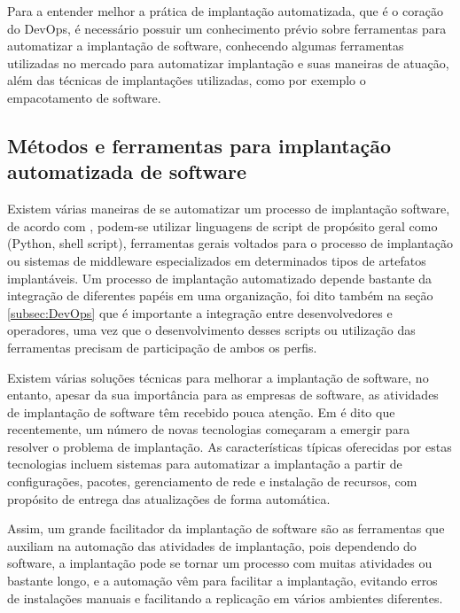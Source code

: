 Para a entender melhor a prática de implantação automatizada, que é o coração
do DevOps, é necessário possuir um conhecimento prévio sobre ferramentas para
automatizar a implantação de software, conhecendo algumas ferramentas utilizadas
no mercado para automatizar implantação e suas maneiras de atuação, além das técnicas
de implantações utilizadas, como por exemplo o empacotamento de software.

\subsection{Métodos e ferramentas para implantação automatizada de software}
\label{subsec:metodoseferramentas}


Existem várias maneiras de se automatizar um processo de implantação software,
de acordo com \cite{leo2014}, podem-se utilizar linguagens de script de propósito
geral como (Python, shell script), ferramentas gerais voltados para o processo
de implantação ou sistemas de middleware especializados em determinados tipos de artefatos implantáveis.
Um processo de implantação automatizado depende bastante da integração de diferentes papéis
em uma organização, foi dito também na seção \ref{subsec:DevOps} que é importante a
integração entre desenvolvedores e operadores, uma vez que o desenvolvimento desses
scripts ou utilização das ferramentas precisam de participação de ambos os perfis.

Existem várias soluções técnicas  para melhorar a implantação de software,
\cite{5741269} no entanto, apesar da sua importância para as empresas de software, as atividades
de implantação de software têm recebido pouca atenção. Em \cite{deployment1998}
é dito que recentemente, um número de novas tecnologias começaram a emergir para
resolver o problema de implantação. As características típicas oferecidas por
estas tecnologias incluem sistemas para automatizar a implantação a partir de
configurações, pacotes, gerenciamento de rede e instalação de recursos, com
propósito de entrega das atualizações de forma automática.

Assim, um grande facilitador da implantação de software são as ferramentas que auxiliam na
automação das atividades de implantação, pois dependendo do software, a implantação
pode se tornar um processo com muitas atividades ou bastante longo, e a automação
vêm para facilitar a implantação, evitando erros de instalações manuais e facilitando a replicação em
vários ambientes diferentes.

